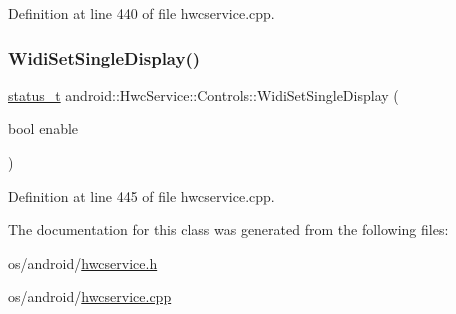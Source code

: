 Definition at line 440 of file hwcservice.\+cpp.


\begin{DoxyCode}{0}
\end{DoxyCode}
\mbox{\label{classandroid_1_1HwcService_1_1Controls_a60113daf8a701fcef054ac2da704a2b9}} 
\subsubsection{\texorpdfstring{Widi\+Set\+Single\+Display()}{WidiSetSingleDisplay()}}
{\footnotesize\ttfamily \mbox{\hyperlink{hwcserviceapi_8h_a3806fb2027d9a316d8ca8d9b8b8eb96f}{status\+\_\+t}} android\+::\+Hwc\+Service\+::\+Controls\+::\+Widi\+Set\+Single\+Display (\begin{DoxyParamCaption}\item[{bool}]{enable }\end{DoxyParamCaption})}



Definition at line 445 of file hwcservice.\+cpp.


\begin{DoxyCode}{0}
\end{DoxyCode}


The documentation for this class was generated from the following files\+:\begin{DoxyCompactItemize}
\item 
os/android/\mbox{\hyperlink{hwcservice_8h}{hwcservice.\+h}}\item 
os/android/\mbox{\hyperlink{hwcservice_8cpp}{hwcservice.\+cpp}}\end{DoxyCompactItemize}
